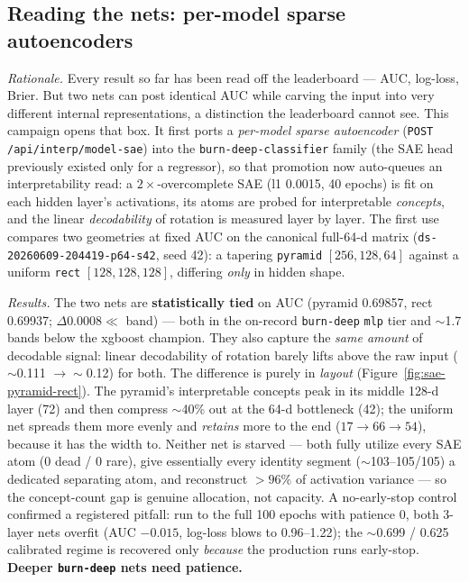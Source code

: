 \documentclass[11pt]{article}
\newcommand{\dsid}[1]{\texttt{\small #1}}
\begin{document}
\subsection{Reading the nets: per-model sparse autoencoders}
\label{sec:anns-sae}
\emph{Rationale.} Every result so far has been read off the leaderboard --- AUC,
log-loss, Brier. But two nets can post identical AUC while carving the input
into very different internal representations, a distinction the leaderboard
cannot see. This campaign opens that box. It first ports a \emph{per-model
sparse autoencoder} (\texttt{POST /api/interp/model-sae}) into the
\texttt{burn-deep-classifier} family (the SAE head previously existed only for a
regressor), so that promotion now auto-queues an interpretability read: a
$2\times$-overcomplete SAE (l1 \num{0.0015}, 40 epochs) is fit on each hidden
layer's activations, its atoms are probed for interpretable \emph{concepts}, and
the linear \emph{decodability} of rotation is measured layer by layer. The first
use compares two geometries at fixed AUC on the canonical full-64-d matrix
(\dsid{ds-20260609-204419-p64-s42}, seed 42): a tapering \texttt{pyramid}
$[256,128,64]$ against a uniform \texttt{rect} $[128,128,128]$, differing
\emph{only} in hidden shape.

\emph{Results.} The two nets are \textbf{statistically tied} on AUC (pyramid
\num{0.69857}, rect \num{0.69937}; $\Delta\num{0.0008}\ll$ band) --- both in the
on-record \texttt{burn-deep} \texttt{mlp} tier and $\sim$1.7 bands below the
xgboost champion. They also capture the \emph{same amount} of decodable signal:
linear decodability of rotation barely lifts above the raw input ($\sim$0.111
$\to\sim$0.12) for both. The difference is purely in \emph{layout}
(Figure~\ref{fig:sae-pyramid-rect}). The pyramid's interpretable concepts peak
in its middle 128-d layer (72) and then compress $\sim$40\% out at the 64-d
bottleneck (42); the uniform net spreads them more evenly and \emph{retains}
more to the end ($17\to66\to54$), because it has the width to. Neither net is
starved --- both fully utilize every SAE atom (0 dead / 0 rare), give
essentially every identity segment ($\sim$103--105/105) a dedicated separating
atom, and reconstruct $>96\%$ of activation variance --- so the concept-count
gap is genuine allocation, not capacity. A no-early-stop control confirmed a
registered pitfall: run to the full 100 epochs with patience 0, both 3-layer
nets overfit (AUC $-\num{0.015}$, log-loss blows to \num{0.96}--\num{1.22}); the
$\sim$0.699 / 0.625 calibrated regime is recovered only \emph{because} the
production runs early-stop. \textbf{Deeper \texttt{burn-deep} nets need
patience.}
\end{document}
